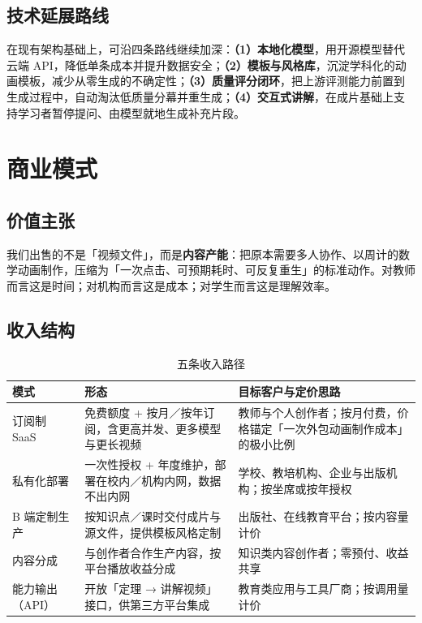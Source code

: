 \documentclass[11pt,a4paper]{ctexart}
\begin{document}
\subsection{技术延展路线}

在现有架构基础上，可沿四条路线继续加深：\textbf{（1）本地化模型}，用开源模型替代云端 API，降低单条成本并提升数据安全；\textbf{（2）模板与风格库}，沉淀学科化的动画模板，减少从零生成的不确定性；\textbf{（3）质量评分闭环}，把上游评测能力前置到生成过程中，自动淘汰低质量分幕并重生成；\textbf{（4）交互式讲解}，在成片基础上支持学习者暂停提问、由模型就地生成补充片段。

\section{商业模式}

\subsection{价值主张}

我们出售的不是「视频文件」，而是\textbf{内容产能}：把原本需要多人协作、以周计的数学动画制作，压缩为「一次点击、可预期耗时、可反复重生」的标准动作。对教师而言这是时间；对机构而言这是成本；对学生而言这是理解效率。

\subsection{收入结构}

\begin{table}[htbp]
\centering
\small
\caption{五条收入路径}
\begin{tabularx}{\textwidth}{@{}p{2.8cm} p{5.0cm} X@{}}
\toprule
\textbf{模式} & \textbf{形态} & \textbf{目标客户与定价思路} \\
\midrule
订阅制 SaaS & 免费额度 + 按月／按年订阅，含更高并发、更多模型与更长视频 & 教师与个人创作者；按月付费，价格锚定「一次外包动画制作成本」的极小比例 \\
私有化部署 & 一次性授权 + 年度维护，部署在校内／机构内网，数据不出内网 & 学校、教培机构、企业与出版机构；按坐席或按年授权 \\
B 端定制生产 & 按知识点／课时交付成片与源文件，提供模板风格定制 & 出版社、在线教育平台；按内容量计价 \\
内容分成 & 与创作者合作生产内容，按平台播放收益分成 & 知识类内容创作者；零预付、收益共享 \\
能力输出（API） & 开放「定理 → 讲解视频」接口，供第三方平台集成 & 教育类应用与工具厂商；按调用量计价 \\
\bottomrule
\end{tabularx}
\end{table}
\end{document}
